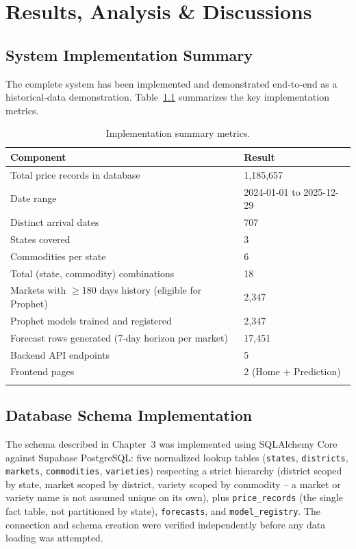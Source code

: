 \chapter{Results, Analysis \& Discussions}

\section{System Implementation Summary}
The complete system has been implemented and demonstrated end-to-end as
a historical-data demonstration. Table~\ref{tab:implsummary} summarizes
the key implementation metrics.

\begin{longtable}{@{}p{8.5cm}p{4.5cm}@{}}
\toprule
\textbf{Component} & \textbf{Result} \\
\midrule
\endhead
Total price records in database & 1{,}185{,}657 \\
Date range & 2024-01-01 to 2025-12-29 \\
Distinct arrival dates & 707 \\
States covered & 3 \\
Commodities per state & 6 \\
Total (state, commodity) combinations & 18 \\
Markets with $\geq$180 days history (eligible for Prophet) & 2{,}347 \\
Prophet models trained and registered & 2{,}347 \\
Forecast rows generated (7-day horizon per market) & 17{,}451 \\
Backend API endpoints & 5 \\
Frontend pages & 2 (Home + Prediction) \\
\bottomrule
\caption{Implementation summary metrics.}
\label{tab:implsummary}
\end{longtable}

\section{Database Schema Implementation}
The schema described in Chapter~3 was implemented using SQLAlchemy Core
against Supabase PostgreSQL: five normalized lookup tables
(\texttt{states}, \texttt{districts}, \texttt{markets},
\texttt{commodities}, \texttt{varieties}) respecting a strict hierarchy
(district scoped by state, market scoped by district, variety scoped by
commodity -- a market or variety name is not assumed unique on its own),
plus \texttt{price\_records} (the single fact table, not partitioned by
state), \texttt{forecasts}, and \texttt{model\_registry}. The connection
and schema creation were verified independently before any data loading
was attempted.


